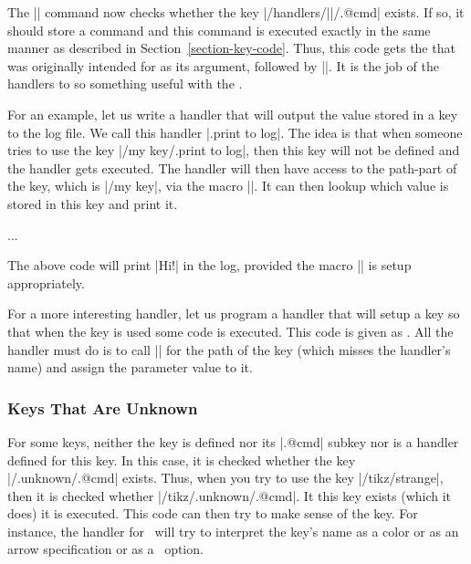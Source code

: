 The |\pgfkeys| command now checks whether the key
|/handlers/||/.@cmd| exists. If so, it should store a command
and this command is executed exactly in the same manner as described
in Section~\ref{section-key-code}.
Thus, this code gets the  that was originally intended for
 as its argument, followed by |\pgfeov|.
It is the job of the handlers to so something useful with the
.

For an example, let us write a handler that will output the value
stored in a key to the log file. We call this handler
|.print to log|. The idea is that when someone tries to use the key
|/my key/.print to log|, then this key will not be defined and the
handler gets executed. The handler will then have access to the
path-part of the key, which is |/my key|, via the macro
|\pgfkeyscurrentpath|. It can then lookup which value is stored in
this key and print it.

\begin{codeexample}
{%
  \pgfkeysgetvalue{\pgfkeyscurrentpath}{\temp}
  \writetolog{\temp}
}
...
\end{codeexample}
The above code will print |Hi!| in the log, provided the macro
|\writetolog| is setup appropriately.

For a more interesting handler, let us program a handler that will
setup a key so that when the key is used some code is executed. This
code is given as . All the handler must do is to call
|\pgfkeysdef| for the path of the key (which misses the handler's
name) and assign the parameter value to it.
\begin{codeexample}[]
\end{codeexample}


\subsubsection{Keys That Are Unknown}

For some keys, neither the key is defined nor its |.@cmd| subkey nor
is a handler defined for this key. In this case, it is checked whether
the key |/.unknown/.@cmd| exists. Thus, when you try to
use the key |/tikz/strange|, then it is checked whether
|/tikz/.unknown/.@cmd|. It this key exists (which it does) it is
executed. This code can then try to make sense of the key. For
instance, the handler for \tikzname\ will try to interpret the key's
name as a color or as an arrow specification or as a \pgfname\
option.

